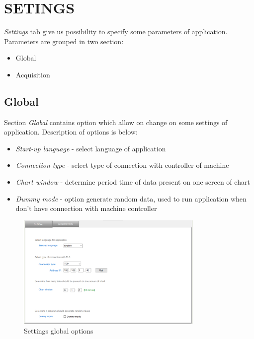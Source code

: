 \section {SETINGS}

\textit{Settings} tab give us possibility to specify some parameters of application. Parameters are grouped in two section:

\begin{itemize}
	\item Global
	\item Acquisition
\end{itemize}

\subsection{Global}
Section \textit{Global} contains option which allow on change on some settings of application. Description of options is below:
\begin{itemize}
	\item \textit{Start-up language} - select language of application 
	\item \textit{Connection type} - select type of connection with controller of machine
	\item \textit{Chart window} - determine period time of data present on one screen of chart
	\item \textit{Dummy mode} - option generate random data, used to run application when don't have connection with machine controller
\end{itemize}

	\begin{figure}[!h] 
	\centering \includegraphics[width=0.8\textwidth]{Graphic/Settings/SettingsGlobal.png}	
	\caption{Settings global options}
	\label{settings_global_options}
	\end{figure}
	\FloatBarrier

